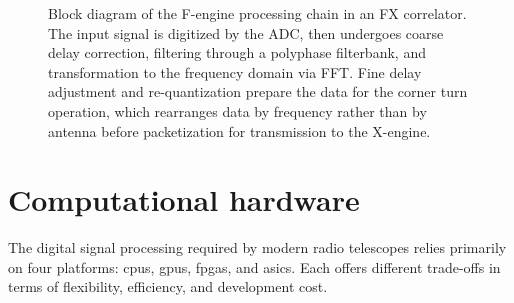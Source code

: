 \begin{figure}[h]
	\centering
	\caption[Block diagram of the F-engine processing chain]{Block diagram of the F-engine processing chain in an FX correlator. The input signal is digitized by the ADC, then undergoes coarse delay correction, filtering through a polyphase filterbank, and transformation to the frequency domain via FFT. Fine delay adjustment and re-quantization prepare the data for the corner turn operation, which rearranges data by frequency rather than by antenna before packetization for transmission to the X-engine.}
	\label{fig:f-engine}
\end{figure}
\section{Computational hardware}
\label{sec:computational_hardware}
The digital signal processing required by modern radio telescopes relies primarily on four platforms: \glspl{cpu}, \glspl{gpu}, \glspl{fpga}, and \glspl{asic}. Each offers different trade-offs in terms of flexibility, efficiency, and development cost.  

